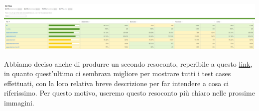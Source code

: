 \begin{center}
        \includegraphics[width=1\textwidth, height=0.1\textheight]{img/png/tests/test_totale_1.png}
\end{center}

Abbiamo deciso anche di produrre un secondo resoconto, reperibile a questo \href{https://plan-it.it/test-report.html} {link}, in quanto quest'ultimo ci sembrava migliore per mostrare tutti i test cases effettuati, con la loro relativa breve descrizione per far intendere a cosa ci riferissimo. Per questo motivo, useremo questo resoconto più chiaro nelle prossime immagini.


